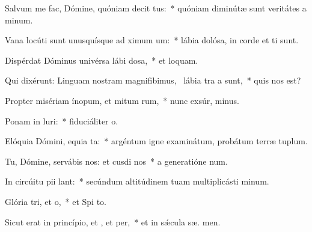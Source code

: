 \item Salvum me fac, Dómine, quóniam decit tus:~* quóniam diminútæ sunt veritátes a  minum.
\item Vana locúti sunt unusquísque ad ximum um:~* lábia dolósa, in corde et  ti sunt.
\item Dispérdat Dóminus univérsa lábi dosa,~* et  loquam.
\item Qui dixérunt: Linguam nostram magnifibimus,~\pscross{} lábia tra a  sunt,~* quis nos  est?
\item Propter misériam ínopum, et mitum rum,~* nunc exsúr,  minus.
\item Ponam in luri:~* fiduciáliter   o.
\item Elóquia Dómini, equia ta:~* argéntum igne examinátum, probátum terræ  tuplum.
\item Tu, Dómine, servábis nos: et cusdi nos~* a generatióne   num.
\item In circúitu pii lant:~* secúndum altitúdinem tuam multiplicásti  minum.
\item Glória tri, et o,~* et Spi to.
\item Sicut erat in princípio, et , et per,~* et in sǽcula sæ. men.
